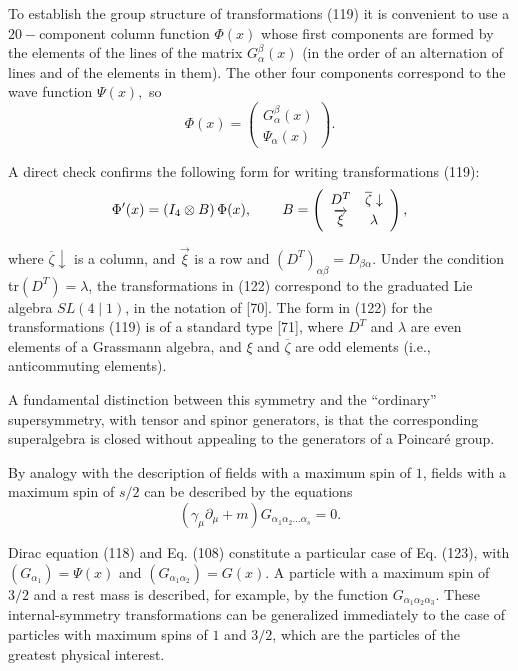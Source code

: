 \documentclass[a4paper,12pt]{article}
\begin{document}
To establish the group structure of transformations (119) it is
convenient to use a $20-$component column function $\Phi (x)$
whose first components are formed by the elements of the lines of
the matrix $G_\alpha ^\beta (x)$ (in the order of an alternation
of lines and of the elements in them). The other four components
correspond to the wave function $\Psi (x),$ so
\begin{equation}
\Phi (x)=\left(
\begin{array}{c}
G_\alpha ^\beta (x) \\
\Psi _\alpha (x)
\end{array}
\right)  .\label{121}
\end{equation}

A direct check confirms the following form for writing
transformations (119):
\begin{equation}
\Phi ^{\prime }(x)=\left( I_4\otimes B\right) \Phi (x) ,
\hspace{0.3in}B=\left(
\begin{array}{cc}
D^T & \overline{\zeta }\downarrow \\
\overrightarrow{\xi } & \lambda
\end{array}
\right)  ,\label{122}
\end{equation}

where $\overline{\zeta} \downarrow $ is a column, and
$\overrightarrow{\xi }$ is a row and $\left( D^T\right) _{\alpha
\beta }=D_{\beta \alpha }$. Under the condition tr$\left(
D^T\right) =\lambda $, the transformations in (122) correspond to
the graduated Lie algebra $SL(4\mid 1)$, in the notation of [70].
The form in (122) for the transformations (119) is of a standard
type [71], where $D^T$ and $\lambda $ are even elements of a
Grassmann algebra, and $\xi $ and $\overline{\zeta }$ are odd
elements (i.e., anticommuting elements).

A fundamental distinction between this symmetry and the ``ordinary''
supersymmetry, with tensor and spinor generators, is that the corresponding
superalgebra is closed without appealing to the generators of a Poincar\'e
group.

By analogy with the description of fields with a maximum spin of $1$, fields
with a maximum spin of $s/2$ can be described by the equations
\begin{equation}
\left( \gamma _\mu \partial _\mu +m\right) G_{\alpha _1\alpha
_2...\alpha _s}=0  .\label{123}
\end{equation}

Dirac equation (118) and Eq. (108) constitute a particular case of
Eq. (123), with $(G_{\alpha _1})=\Psi (x)$ and $(G_{\alpha
_1\alpha _2})=G(x)$. A particle with a maximum spin of $3/2$ and a
rest mass is described, for example, by the function $G_{\alpha
_1\alpha _2\alpha _3}$. These internal-symmetry transformations
can be generalized immediately to the case of particles with
maximum spins of $1$ and $3/2$, which are the particles of the
greatest physical interest.
\end{document}
